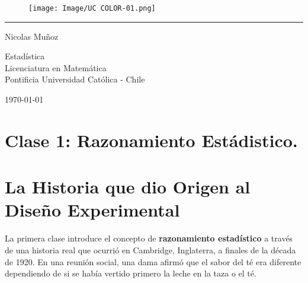 \documentclass[11pt]{article}
\def\reportTile{Apuntes}			%
\def\subject{Estadística}			%
\def\writter{Nicolas Muñoz}		%
\def\course{Licenciatura en Matemática}
\def\university{Pontificia Universidad Católica - Chile}
\def\course{Licenciatura en Matemática}
\def\university{Pontificia Universidad Católica - Chile}
\theoremstyle{definition} %
\begin{document}
\begin{titlepage}

	\def\logoSize{0.2}
	\begin{figure}
  \hfill
  \texttt{[image: Image/UC COLOR-01.png]}
	\end{figure}

	\vspace*{1.75cm}

	\begin{spacing}{2}
	\centering{
	\Huge{
		\textbf{\reportTile}
	}
	}
	\end{spacing}
	
	\hrule
	
	\vfill
	\begin{flushright}
	\LARGE{\writter}

	\vspace{2cm}
	
	\Large
	\subject\\
	\course\\
	\university
	
	\vspace{1cm}
	
	\today
	\end{flushright}
	
\end{titlepage}
	

\tableofcontents
\cleardoublepage


\section{Clase 1: Razonamiento Estádistico.}

\section{La Historia que dio Origen al Diseño Experimental}

La primera clase introduce el concepto de \textbf{razonamiento estadístico} a través de una historia real que ocurrió en Cambridge, Inglaterra, a finales de la década de 1920. En una reunión social, una dama afirmó que el sabor del té era diferente dependiendo de si se había vertido primero la leche en la taza o el té.
\end{document}
